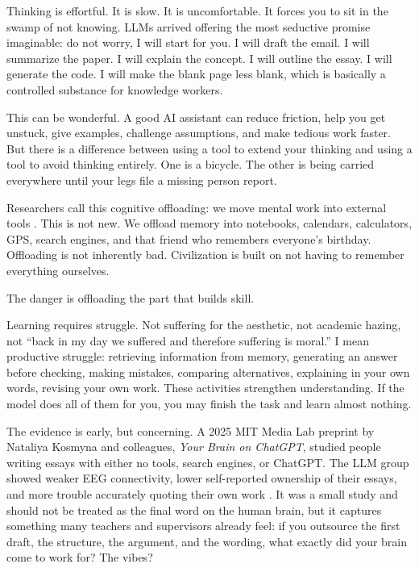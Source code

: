 \documentclass[12pt,oneside]{book}
\begin{document}
Thinking is effortful. It is slow. It is uncomfortable. It forces you to sit in the swamp of not knowing. LLMs arrived offering the most seductive promise imaginable: do not worry, I will start for you. I will draft the email. I will summarize the paper. I will explain the concept. I will outline the essay. I will generate the code. I will make the blank page less blank, which is basically a controlled substance for knowledge workers.

This can be wonderful. A good AI assistant can reduce friction, help you get unstuck, give examples, challenge assumptions, and make tedious work faster. But there is a difference between using a tool to extend your thinking and using a tool to avoid thinking entirely. One is a bicycle. The other is being carried everywhere until your legs file a missing person report.

Researchers call this cognitive offloading: we move mental work into external tools \parencite{risko2016}. This is not new. We offload memory into notebooks, calendars, calculators, GPS, search engines, and that friend who remembers everyone's birthday. Offloading is not inherently bad. Civilization is built on not having to remember everything ourselves.

The danger is offloading the part that builds skill.

Learning requires struggle. Not suffering for the aesthetic, not academic hazing, not ``back in my day we suffered and therefore suffering is moral.'' I mean productive struggle: retrieving information from memory, generating an answer before checking, making mistakes, comparing alternatives, explaining in your own words, revising your own work. These activities strengthen understanding. If the model does all of them for you, you may finish the task and learn almost nothing.

The evidence is early, but concerning. A 2025 MIT Media Lab preprint by Nataliya Kosmyna and colleagues, \emph{Your Brain on ChatGPT}, studied people writing essays with either no tools, search engines, or ChatGPT. The LLM group showed weaker EEG connectivity, lower self-reported ownership of their essays, and more trouble accurately quoting their own work \parencite{kosmyna2025}. It was a small study and should not be treated as the final word on the human brain, but it captures something many teachers and supervisors already feel: if you outsource the first draft, the structure, the argument, and the wording, what exactly did your brain come to work for? The vibes?
\end{document}

